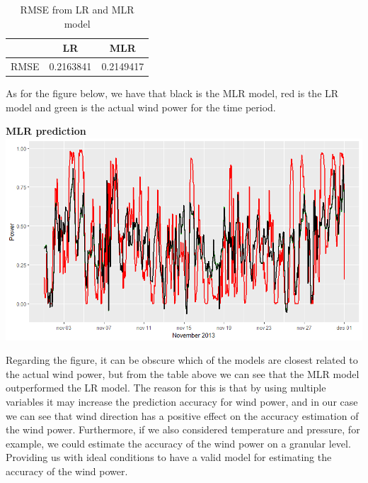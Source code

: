 \documentclass[
11pt, %
english, %
singlespacing, %
parskip, %
headsepline, %
]{report} %
\begin{document}
 	
 	\begin{table}[!h]
        \centering
        \begin{tabular}{|c|c|c|}
            \hline
             & LR & MLR \\
            \hline
            RMSE & 0.2163841 & 0.2149417 \\
            \hline
        \end{tabular}
        \caption{RMSE from LR and MLR model}
        \label{LR_MLR_RMSE_results}
    \end{table}
 	
    As for the figure below, we have that black is the MLR model, red is the LR model and green is the actual wind power for the time period.
    
\newpage

    \begin{center}
        \textbf{MLR prediction}\\
	    \includegraphics[scale=0.3, width=\textwidth]{figures/Rplot_MLR.png}\\[1cm]
    \end{center}
    
    Regarding the figure, it can be obscure which of the models are closest related to the actual wind power, but from the table above we can see that the MLR model outperformed the LR model. The reason for this is that by using multiple variables it may increase the prediction accuracy for wind power, and in our case we can see that wind direction has a positive effect on the accuracy estimation of the wind power. Furthermore, if we also considered temperature and pressure, for example, we could estimate the accuracy of the wind power on a granular level. Providing us with ideal conditions to have a valid model for estimating the accuracy of the wind power.
	
\end{document}
